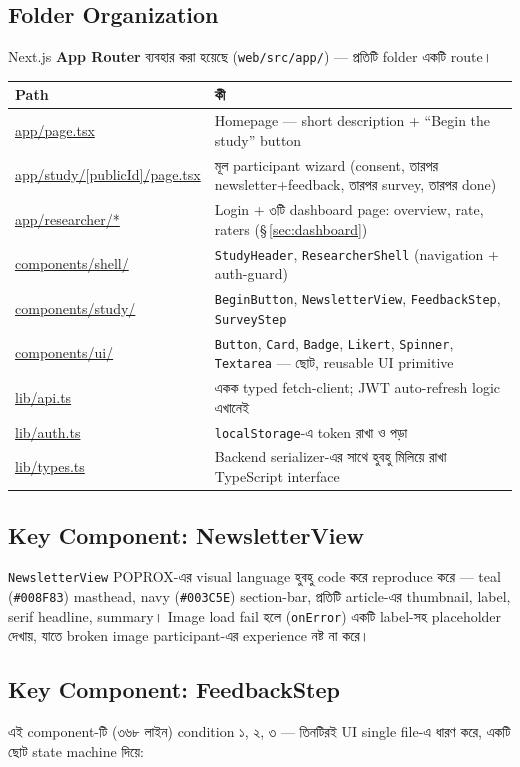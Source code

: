 \documentclass[11pt,a4paper]{article}
\newcommand{\code}[1]{\texttt{\small #1}}
\newcommand{\file}[1]{\texttt{\small #1}}
\newcommand{\pathcode}[1]{{\small\url{#1}}}
\begin{document}
\subsection{Folder Organization}
Next.js \textbf{App Router} ব্যবহার করা হয়েছে (\file{web/src/app/}) --- প্রতিটি folder একটি
route।

\begin{longtable}{@{}p{5.2cm}p{10.2cm}@{}}
\toprule
\textbf{Path} & \textbf{কী} \\
\midrule
\endhead
\pathcode{app/page.tsx} & Homepage --- short description \;+\; ``Begin the study'' button \\
\pathcode{app/study/[publicId]/page.tsx} & মূল participant wizard (consent, তারপর
  newsletter+feedback, তারপর survey, তারপর done) \\
\pathcode{app/researcher/*} & Login \;+\; ৩টি dashboard page: overview, rate, raters
  (\S\,\ref{sec:dashboard}) \\
\pathcode{components/shell/} & \code{StudyHeader}, \code{ResearcherShell} (navigation \;+\;
  auth-guard) \\
\pathcode{components/study/} & \code{BeginButton}, \code{NewsletterView}, \code{FeedbackStep},
  \code{SurveyStep} \\
\pathcode{components/ui/} & \code{Button}, \code{Card}, \code{Badge}, \code{Likert},
  \code{Spinner}, \code{Textarea} --- ছোট, reusable UI primitive \\
\pathcode{lib/api.ts} & একক typed fetch-client; JWT auto-refresh logic এখানেই \\
\pathcode{lib/auth.ts} & \code{localStorage}-এ token রাখা ও পড়া \\
\pathcode{lib/types.ts} & Backend serializer-এর সাথে হুবহু মিলিয়ে রাখা TypeScript interface \\
\bottomrule
\end{longtable}

\subsection{Key Component: NewsletterView}
\code{NewsletterView} POPROX-এর visual language হুবহু code করে reproduce করে --- teal
(\code{\#008F83}) masthead, navy (\code{\#003C5E}) section-bar, প্রতিটি article-এর thumbnail,
label, serif headline, summary। Image load fail হলে (\code{onError}) একটি label-সহ
placeholder দেখায়, যাতে broken image participant-এর experience নষ্ট না করে।

\subsection{Key Component: FeedbackStep}
এই component-টি (৩৬৮ লাইন) condition ১, ২, ৩ --- তিনটিরই UI single file-এ ধারণ করে, একটি
ছোট state machine দিয়ে:
\end{document}
